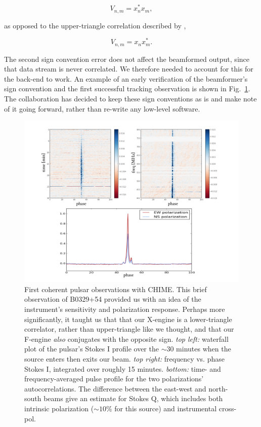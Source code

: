 \begin{equation}
V_{n, m} = x_n^* x_m,
\end{equation}

\noindent as opposed to the upper-triangle correlation described by 
\citet{2015arXiv150306203K}, 

\begin{equation}
V_{n, m} = x_n x_m^*.
\end{equation}

The second sign convention error does not affect the beamformed 
output, since that data stream is never correlated. We therefore 
needed to account for this for the back-end to work. An example 
of an early verification of the beamformer's sign convention 
and the first successful tracking observation is shown in Fig.~\ref{fig-bf_b0329}. 
The collaboration has decided to keep these sign conventions as is
and make note of it going forward, rather than re-write any low-level 
software.


\begin{figure}[!h]
\begin{center}
\includegraphics[trim={0.8in, 0in, 0in, 0in}, scale=0.5]{./figures/beamforming/b0329_testing.jpeg}
\caption[abc]{First coherent pulsar observations with CHIME. This 
brief observation of B0329+54 provided us with an idea 
of the instrument's sensitivity and polarization response. 
Perhaps more significantly, it taught us that 
that our X-engine is a lower-triangle correlator, rather than 
upper-triangle like we thought, and that our F-engine \textit{also}
conjugates with the opposite sign. \textit{top left:} waterfall plot
of the pulsar's Stokes I profile over the $\sim$30 minutes when the 
source enters then exits our beam. \textit{top right:} frequency 
vs. phase Stokes I, integrated over roughly 15 minutes. 
\textit{bottom:} time- and frequency-averaged pulse profile 
for the two polarizations' autocorrelations. The difference between 
the east-west and north-south beams give an estimate for Stokes Q, which 
includes both intrinsic polarization ($\sim10\%$ for this source)
and instrumental cross-pol.}
\label{fig-bf_b0329}
\vspace{0.4cm}   
\end{center}
\end{figure}


